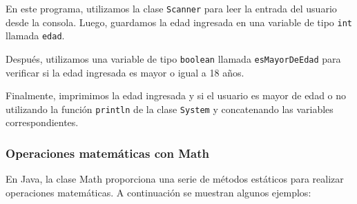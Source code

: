 \documentclass[executivepaper]{article}
\begin{document}
En este programa, utilizamos la clase \lstinline{Scanner} para leer la entrada del usuario desde la consola. Luego, guardamos la edad ingresada en una variable de tipo \lstinline{int} llamada \lstinline{edad}.

Después, utilizamos una variable de tipo \lstinline{boolean} llamada \lstinline{esMayorDeEdad} para verificar si la edad ingresada es mayor o igual a 18 años.

Finalmente, imprimimos la edad ingresada y si el usuario es mayor de edad o no utilizando la función \lstinline{println} de la clase \lstinline{System} y concatenando las variables correspondientes.

\subsubsection{Operaciones matemáticas con Math}
En Java, la clase Math proporciona una serie de métodos estáticos para realizar operaciones matemáticas. A continuación se muestran algunos ejemplos:
\end{document}
